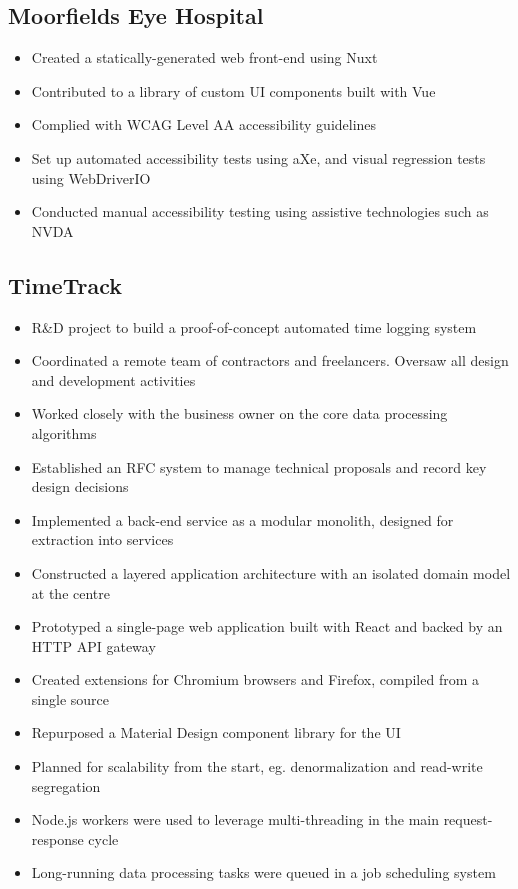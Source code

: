 \documentclass[a4paper,10pt]{article}
\begin{document}

\subsection*{Moorfields Eye Hospital \hfill {}}
\begin{itemize}
  \item Created a statically-generated web front-end using Nuxt
  \item Contributed to a library of custom UI components built with Vue
  \item Complied with WCAG Level AA accessibility guidelines
  \item Set up automated accessibility tests using aXe, and visual regression tests using WebDriverIO
  \item Conducted manual accessibility testing using assistive technologies such as NVDA
\end{itemize}

\subsection*{TimeTrack \hfill {}}
\begin{itemize}
  \item R\&D project to build a proof-of-concept automated time logging system
  \item Coordinated a remote team of contractors and freelancers. Oversaw all design and development activities
  \item Worked closely with the business owner on the core data processing algorithms
  \item Established an RFC system to manage technical proposals and record key design decisions
  \item Implemented a back-end service as a modular monolith, designed for extraction into services
  \item Constructed a layered application architecture with an isolated domain model at the centre
  \item Prototyped a single-page web application built with React and backed by an HTTP API gateway
  \item Created extensions for Chromium browsers and Firefox, compiled from a single source
  \item Repurposed a Material Design component library for the UI
  \item Planned for scalability from the start, eg. denormalization and read-write segregation
  \item Node.js workers were used to leverage multi-threading in the main request-response cycle
  \item Long-running data processing tasks were queued in a job scheduling system
\end{itemize}
\end{document}
